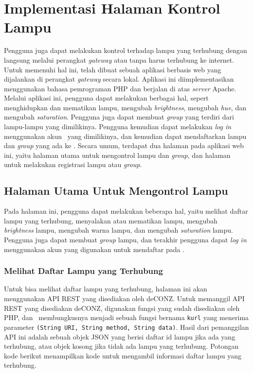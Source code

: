 \section{Implementasi Halaman Kontrol Lampu}
Pengguna juga dapat melakukan kontrol terhadap lampu yang terhubung dengan langsung melalui perangkat \textit{gateway} atau tanpa harus terhubung ke internet. Untuk memenuhi hal ini, telah dibuat sebuah aplikasi berbasis web yang dijalankan di perangkat \textit{gateway} secara lokal. Aplikasi ini diimplementasikan menggunakan bahasa pemrograman PHP dan berjalan di atas \textit{server} Apache. Melalui aplikasi ini, pengguna dapat melakukan berbagai hal, sepert menghidupkan dan mematikan lampu, mengubah \textit{brightness}, mengubah \textit{hue}, dan mengubah \textit{saturation}. Pengguna juga dapat membuat \textit{group} yang terdiri dari lampu-lampu yang dimilikinya. Pengguna kemudian dapat melakukan \textit{log in} menggunakan akun \plat~yang dimilikinya, dan kemudian dapat mendaftarkan lampu dan \textit{group} yang ada ke \plat. Secara umum, terdapat dua halaman pada aplikasi web ini, yaitu halaman utama untuk mengontrol lampu dan \textit{group}, dan halaman untuk melakukan registrasi lampu atau \textit{group}.

\subsection{Halaman Utama Untuk Mengontrol Lampu}
Pada halaman ini, pengguna dapat melakukan beberapa hal, yaitu  melihat daftar lampu yang terhubung, menyalakan atau mematikan lampu, mengubah \textit{brightness} lampu, mengubah warna lampu, dan mengubah \textit{saturation} lampu. Pengguna juga dapat membuat \textit{group} lampu, dan terakhir pengguna dapat \textit{log in} menggunakan akun yang digunakan untuk mendaftar pada \plat.

\subsubsection{Melihat Daftar Lampu yang Terhubung}
Untuk bisa melihat daftar lampu yang terhubung, halaman ini akan menggunakan API REST yang disediakan oleh deCONZ. Untuk memanggil API REST yang disediakan deCONZ, digunakan fungsi  yang sudah disediakan oleh PHP, dan \saya~membungkusnya menjadi sebuah fungsi bernama \texttt{kurl} yang menerima parameter \texttt{(String URI, String method, String data)}. Hasil dari pemanggilan API ini adalah sebuah objek JSON yang berisi daftar id lampu jika ada yang terhubung, atau objek kosong jika tidak ada lampu yang terhubung. Potongan kode berikut menampilkan kode untuk mengambil informasi daftar lampu yang terhubung.

